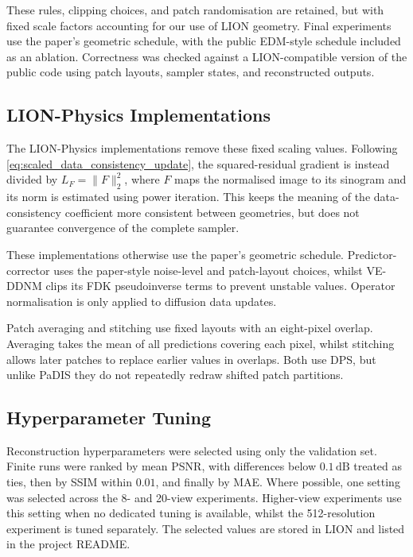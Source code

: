 These rules, clipping choices, and patch randomisation are retained, but with fixed scale factors accounting for our use of LION geometry. Final experiments use the paper's geometric schedule, with the public EDM-style schedule included as an ablation. Correctness was checked against a LION-compatible version of the public code using patch layouts, sampler states, and reconstructed outputs.

\subsection{LION-Physics Implementations}
\label{subsec:lion-physics-implementations}
The LION-Physics implementations remove these fixed scaling values. Following \autoref{eq:scaled_data_consistency_update}, the squared-residual gradient is instead divided by $L_F=\lVert F\rVert_2^2$, where $F$ maps the normalised image to its sinogram and its norm is estimated using power iteration. This keeps the meaning of the data-consistency coefficient more consistent between geometries, but does not guarantee convergence of the complete sampler.

These implementations otherwise use the paper's geometric schedule. Predictor-corrector uses the paper-style noise-level and patch-layout choices, whilst VE-DDNM clips its FDK pseudoinverse terms to prevent unstable values. Operator normalisation is only applied to diffusion data updates.

Patch averaging and stitching use fixed layouts with an eight-pixel overlap. Averaging takes the mean of all predictions covering each pixel, whilst stitching allows later patches to replace earlier values in overlaps. Both use DPS, but unlike PaDIS they do not repeatedly redraw shifted patch partitions.

\subsection{Hyperparameter Tuning}
Reconstruction hyperparameters were selected using only the validation set. Finite runs were ranked by mean PSNR, with differences below $0.1\,\mathrm{dB}$ treated as ties, then by SSIM within $0.01$, and finally by MAE. Where possible, one setting was selected across the 8- and 20-view experiments. Higher-view experiments use this setting when no dedicated tuning is available, whilst the 512-resolution experiment is tuned separately. The selected values are stored in LION and listed in the project README.


